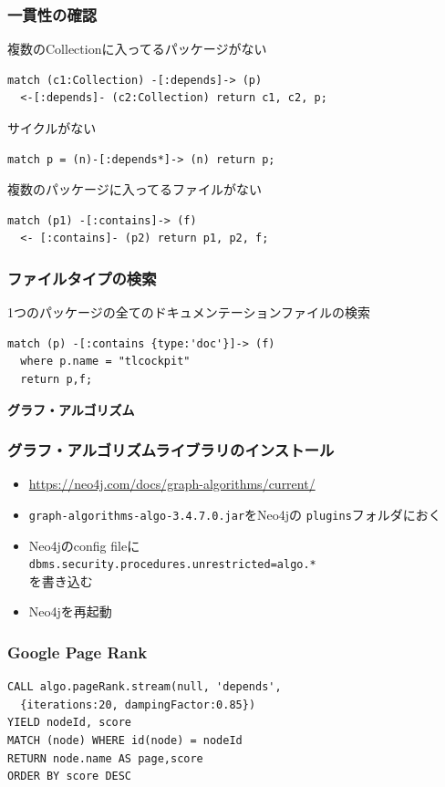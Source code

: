 \documentclass[hyperref]{beamer}
\newcommand{\cutin}[1]{%
  \begin{frame}[c]
    \begin{center}
      {\Large\bf\usebeamercolor[fg]{structure}#1}
    \end{center}
  \end{frame}
}
\begin{document}
\begin{frame}[fragile]
  \frametitle{一貫性の確認}
  \pause
  複数のCollectionに入ってるパッケージがない
\begin{lstlisting}
match (c1:Collection) -[:depends]-> (p)
  <-[:depends]- (c2:Collection) return c1, c2, p;
\end{lstlisting}
\pause
サイクルがない
\begin{lstlisting}
match p = (n)-[:depends*]-> (n) return p;
\end{lstlisting}

\pause
複数のパッケージに入ってるファイルがない
\begin{lstlisting}
match (p1) -[:contains]-> (f)
  <- [:contains]- (p2) return p1, p2, f;
\end{lstlisting}

\end{frame}


\begin{frame}[fragile]
  \frametitle{ファイルタイプの検索}
  1つのパッケージの全てのドキュメンテーションファイルの検索
\begin{lstlisting}
match (p) -[:contains {type:'doc'}]-> (f)
  where p.name = "tlcockpit"
  return p,f;
\end{lstlisting}
  
\end{frame}

\cutin{グラフ・アルゴリズム}

\begin{frame}
  \frametitle{グラフ・アルゴリズムライブラリのインストール}
  \begin{itemize}
  \item \url{https://neo4j.com/docs/graph-algorithms/current/}
  \item \texttt{graph-algorithms-algo-3.4.7.0.jar}をNeo4jの
    \texttt{plugins}フォルダにおく
  \item Neo4jのconfig fileに\\
    \texttt{dbms.security.procedures.unrestricted=algo.*}\\
    を書き込む
  \item Neo4jを再起動
  \end{itemize}
\end{frame}

\begin{frame}[fragile]
  \frametitle{Google Page Rank}
\begin{lstlisting}
CALL algo.pageRank.stream(null, 'depends',
  {iterations:20, dampingFactor:0.85})
YIELD nodeId, score
MATCH (node) WHERE id(node) = nodeId
RETURN node.name AS page,score
ORDER BY score DESC
\end{lstlisting}
\end{frame}
\end{document}
